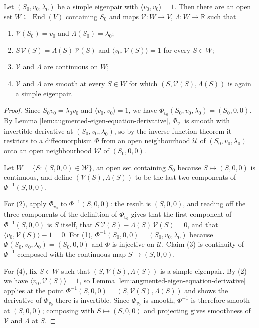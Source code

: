 \begin{proposition}
\label{prop:smooth-eigen-selection}
\leanok
{}
Let $(S_0, v_0, \lambda_0)$ be a simple eigenpair with $\langle v_0, v_0\rangle = 1$. Then there are an open set $W \subseteq \operatorname{End}(V)$ containing $S_0$ and maps $\mathcal{V} : W \to V$, $\Lambda : W \to \mathbb{R}$ such that
\begin{enumerate}
  \item $\mathcal{V}(S_0) = v_0$ and $\Lambda(S_0) = \lambda_0$;
  \item $S\,\mathcal{V}(S) = \Lambda(S)\,\mathcal{V}(S)$ and $\langle v_0, \mathcal{V}(S)\rangle = 1$ for every $S \in W$;
  \item $\mathcal{V}$ and $\Lambda$ are continuous on $W$;
  \item $\mathcal{V}$ and $\Lambda$ are smooth at every $S \in W$ for which $(S, \mathcal{V}(S), \Lambda(S))$ is again a simple eigenpair.
\end{enumerate}
\end{proposition}

\begin{proof}
\leanok
{}
Since $S_0 v_0 = \lambda_0 v_0$ and $\langle v_0,v_0\rangle = 1$, we have $\Phi_{v_0}(S_0,v_0,\lambda_0) = (S_0,0,0)$. By Lemma \ref{lem:augmented-eigen-equation-derivative}, $\Phi_{v_0}$ is smooth with invertible derivative at $(S_0,v_0,\lambda_0)$, so by the inverse function theorem it restricts to a diffeomorphism $\Phi$ from an open neighbourhood $\mathcal{U}$ of $(S_0,v_0,\lambda_0)$ onto an open neighbourhood $\mathcal{W}$ of $(S_0,0,0)$.

Let $W = \{S : (S,0,0) \in \mathcal{W}\}$, an open set containing $S_0$ because $S \mapsto (S,0,0)$ is continuous, and define $(\mathcal{V}(S), \Lambda(S))$ to be the last two components of $\Phi^{-1}(S,0,0)$.

For (2), apply $\Phi_{v_0}$ to $\Phi^{-1}(S,0,0)$: the result is $(S,0,0)$, and reading off the three components of the definition of $\Phi_{v_0}$ gives that the first component of $\Phi^{-1}(S,0,0)$ is $S$ itself, that $S\,\mathcal{V}(S) - \Lambda(S)\,\mathcal{V}(S) = 0$, and that $\langle v_0, \mathcal{V}(S)\rangle - 1 = 0$. For (1), $\Phi^{-1}(S_0,0,0) = (S_0,v_0,\lambda_0)$ because $\Phi(S_0,v_0,\lambda_0) = (S_0,0,0)$ and $\Phi$ is injective on $\mathcal{U}$. Claim (3) is continuity of $\Phi^{-1}$ composed with the continuous map $S \mapsto (S,0,0)$.

For (4), fix $S \in W$ such that $(S,\mathcal{V}(S),\Lambda(S))$ is a simple eigenpair. By (2) we have $\langle v_0, \mathcal{V}(S)\rangle = 1$, so Lemma \ref{lem:augmented-eigen-equation-derivative} applies at the point $\Phi^{-1}(S,0,0) = (S, \mathcal{V}(S), \Lambda(S))$ and shows the derivative of $\Phi_{v_0}$ there is invertible. Since $\Phi_{v_0}$ is smooth, $\Phi^{-1}$ is therefore smooth at $(S,0,0)$; composing with $S \mapsto (S,0,0)$ and projecting gives smoothness of $\mathcal{V}$ and $\Lambda$ at $S$.
\end{proof}

